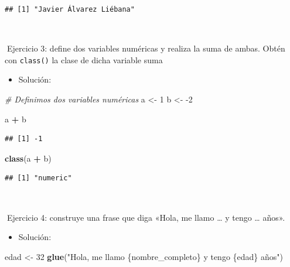 \documentclass[11pt,]{book}
\newenvironment{Shaded}{\begin{snugshade}}{\end{snugshade}}
\newcommand{\CommentTok}[1]{\textcolor[rgb]{0.37,0.37,0.37}{\textit{#1}}}
\newcommand{\DecValTok}[1]{\textcolor[rgb]{0.06,0.06,0.06}{#1}}
\newcommand{\KeywordTok}[1]{\textcolor[rgb]{0.27,0.27,0.27}{\textbf{#1}}}
\newcommand{\NormalTok}[1]{#1}
\newcommand{\OperatorTok}[1]{\textcolor[rgb]{0.43,0.43,0.43}{\textbf{#1}}}
\newcommand{\StringTok}[1]{\textcolor[rgb]{0.5,0.5,0.5}{#1}}
\providecommand{\tightlist}{%
  \setlength{\itemsep}{0pt}\setlength{\parskip}{0pt}}
\begin{document}
\begin{verbatim}
## [1] "Javier Álvarez Liébana"
\end{verbatim}

~

📝Ejercicio 3: define dos variables numéricas y realiza la suma de ambas. Obtén con \texttt{class()} la clase de dicha variable suma

\begin{itemize}
\tightlist
\item
  Solución:
\end{itemize}

\begin{Shaded}
\begin{Highlighting}[]
\CommentTok{# Definimos dos variables numéricas}
\NormalTok{a <-}\StringTok{ }\DecValTok{1}
\NormalTok{b <-}\StringTok{ }\DecValTok{-2}

\NormalTok{a }\OperatorTok{+}\StringTok{ }\NormalTok{b}
\end{Highlighting}
\end{Shaded}

\begin{verbatim}
## [1] -1
\end{verbatim}

\begin{Shaded}
\begin{Highlighting}[]
\KeywordTok{class}\NormalTok{(a }\OperatorTok{+}\StringTok{ }\NormalTok{b)}
\end{Highlighting}
\end{Shaded}

\begin{verbatim}
## [1] "numeric"
\end{verbatim}

~

📝Ejercicio 4: construye una frase que diga «Hola, me llamo \ldots{} y tengo \ldots{} años».

\begin{itemize}
\tightlist
\item
  Solución:
\end{itemize}

\begin{Shaded}
\begin{Highlighting}[]
\NormalTok{edad <-}\StringTok{ }\DecValTok{32}
\KeywordTok{glue}\NormalTok{(}\StringTok{"Hola, me llamo \{nombre_completo\} y tengo \{edad\} años"}\NormalTok{)}
\end{Highlighting}
\end{Shaded}
\end{document}
